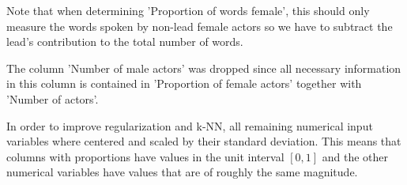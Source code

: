 \documentclass[../../project.tex]{subfiles}
\begin{document}
	Note that when determining 'Proportion of words female', this should only measure the words spoken by non-lead female actors so we have to subtract the lead's contribution to the total number of words.
	
	The column 'Number of male actors' was dropped since all necessary information in this column is contained in 'Proportion of female actors' together with 'Number of actors'.
	
	In order to improve regularization and k-NN, all remaining numerical input variables where centered and scaled by their standard deviation. This means that columns with proportions have values in the unit interval $[0,1]$ and the other numerical variables have values that are of roughly the same magnitude.
	
\end{document}
